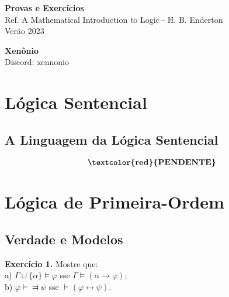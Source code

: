 \documentclass[11pt]{article}
\newcommand{\subs}[2]{
    \setcounter{subsection}{#1 - 1}
    \subsection{#2}
    }
\begin{document}
\thispagestyle{empty}

\begin{center}
{\LARGE \bf Provas e Exercícios}\\
{\large Ref. A Mathematical Introduction to Logic - H. B. Enderton}\\
Verão 2023

\vspace{0.7cm}
\textbf{Xenônio}\\
Discord: xennonio
\end{center}

\tableofcontents

\section{Lógica Sentencial}

\subs{1}{A Linguagem da Lógica Sentencial}

$$\textbf{\textcolor{red}{PENDENTE}}$$

\section{Lógica de Primeira-Ordem}

\subs{2}{Verdade e Modelos}

\begin{shaded}
\textbf{Exercício 1.} Mostre que:\\
a) $\Gamma\cup\{\alpha\}\vDash\varphi$ sse $\Gamma\vDash(\alpha\to\varphi)$;\\
b) $\varphi\vDash\Dashv\psi$ sse $\vDash(\varphi\leftrightarrow\psi)$.
\end{shaded}
\end{document}
